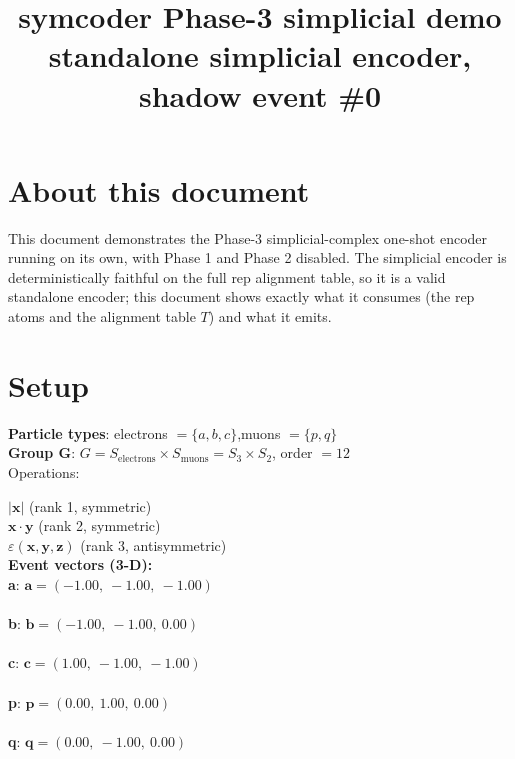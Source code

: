 \documentclass[a4paper,11pt]{article}
\title{symcoder Phase-3 simplicial demo\\\large standalone simplicial encoder, shadow event \#0}
\date{}
\newcommand{\vc}[1]{\ensuremath{\mathbf{#1}}}
\newcommand{\dnfagmiihhiejm}[1]{|\vc{#1}|}
\newcommand{\pdcegfomjfhook}[2]{\mathbf{#1} \cdot \mathbf{#2}}
\newcommand{\kblbmcpggoncpf}[3]{\varepsilon(\mathbf{#1},\mathbf{#2},\mathbf{#3})}
\begin{document}
\maketitle

\section{About this document}
This document demonstrates the Phase-3 simplicial-complex one-shot encoder running on its own, with Phase 1 and Phase 2 disabled.  The simplicial encoder is deterministically faithful on the full rep alignment table, so it is a valid standalone encoder; this document shows exactly what it consumes (the rep atoms and the alignment table $T$) and what it emits.\\[1ex]

\section{Setup}
\textbf{Particle types}: electrons $= \{a, b, c\}$,\quad muons $= \{p, q\}$\\
\textbf{Group G}: $G = S_{\text{electrons}} \times S_{\text{muons}} = S_{3} \times S_{2}$, order $= 12$\\

Operations:

$\dnfagmiihhiejm{x}$ \quad (rank 1, symmetric)\\
$\pdcegfomjfhook{x}{y}$ \quad (rank 2, symmetric)\\
$\kblbmcpggoncpf{x}{y}{z}$ \quad (rank 3, antisymmetric)\\

\textbf{Event vectors (3-D):}\\
\textbf{  a}: $\vc{a} = (-1.00,\ -1.00,\ -1.00)$\\\\
\textbf{  b}: $\vc{b} = (-1.00,\ -1.00,\ 0.00)$\\\\
\textbf{  c}: $\vc{c} = (1.00,\ -1.00,\ -1.00)$\\\\
\textbf{  p}: $\vc{p} = (0.00,\ 1.00,\ 0.00)$\\\\
\textbf{  q}: $\vc{q} = (0.00,\ -1.00,\ 0.00)$\\\\
\end{document}
